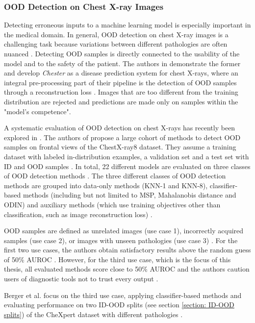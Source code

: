 \subsubsection{OOD Detection on Chest X-ray Images}
\label{section: OOD detection on Chest X-ray Images}
Detecting erroneous inputs to a machine learning model is especially important in the medical domain.
In general, OOD detection on chest X-ray images is a challenging task because variations between different pathologies are often nuanced \citep{Salehi2022}.
Detecting OOD samples is directly connected to the usability of the model and to the safety of the patient.
The authors in \citep{Cohen2019} demonstrate the former and develop \textit{Chester} as a disease prediction system for chest X-rays, where an integral pre-processing part of their pipeline is the detection of OOD samples through a reconstruction loss \citep{Dumoulin2017}. 
Images that are too different from the training distribution are rejected \citep{Cohen2019} and predictions are made only on samples within the "model's competence".
\par
A systematic evaluation of OOD detection on chest X-rays has recently been explored in \citep{Cao2020}.
The authors of \citep{Cao2020} propose a large cohort of methods to detect OOD samples on frontal views of the ChestX-ray8 \citep{Wang2017} dataset.
They assume a training dataset with labeled in-distribution examples, a validation set and a test set with ID and OOD samples \citep{Cao2020}.
In total, 22 different models are evaluated on three classes of OOD detection methods \citep{Cao2020}.
The three different classes of OOD detection methods are grouped into data-only methods (KNN-1 and KNN-8), classifier-based methods (including but not limited to MSP, Mahalanobis distance and ODIN) and auxiliary methods (which use training objectives other than classification, such as image reconstruction loss) \citep{Cao2020}.
\par
OOD samples are defined as unrelated images (use case 1), incorrectly acquired samples (use case 2), or images with unseen pathologies (use case 3) \citep{Cao2020}.
For the first two use cases, the authors obtain satisfactory results above the random guess of 50\% AUROC \citep{Cao2020}.
However, for the third use case, which is the focus of this thesis, all evaluated methods score close to 50\% AUROC and the authors caution users of diagnostic tools not to trust every output \citep{Cao2020}.
\par
Berger et al. \citep{Berger2021} focus on the third use case, applying classifier-based methods and evaluating performance on two ID-OOD splits (see section \ref{section: ID-OOD splits}) of the CheXpert dataset \citep{Irvin2019} with different pathologies \citep{Berger2021}.
